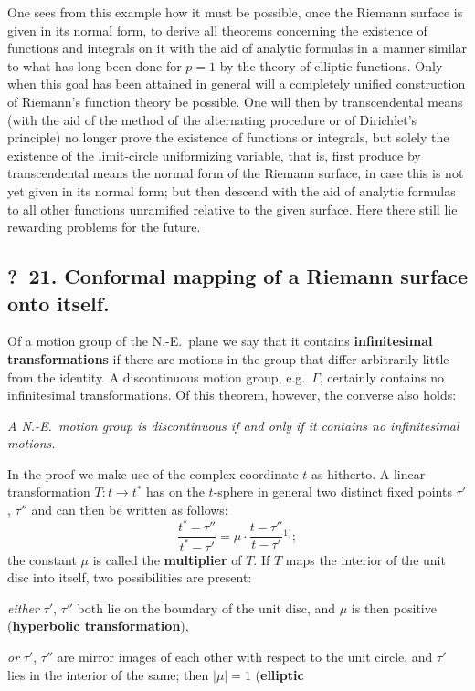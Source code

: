 \documentclass{article}
\begin{document}
One sees from this example how it must be possible, once the Riemann surface is given in its normal form, to derive all theorems concerning the existence of functions and integrals on it with the aid of analytic formulas in a manner similar to what has long been done for $p = 1$ by the theory of elliptic functions. Only when this goal has been attained in general will a completely unified construction of Riemann's function theory be possible. One will then by transcendental means (with the aid of the method of the alternating procedure or of Dirichlet's principle) no longer prove the existence of functions or integrals, but solely the existence of the limit-circle uniformizing variable, that is, first produce by transcendental means the normal form of the Riemann surface, in case this is not yet given in its normal form; but then descend with the aid of analytic formulas to all other functions unramified relative to the given surface. Here there still lie rewarding problems for the future.

\subsection*{?~21. Conformal mapping of a Riemann surface onto itself.}

Of a motion group of the N.-E.\ plane we say that it contains \textbf{infinitesimal transformations} if there are motions in the group that differ arbitrarily little from the identity. A discontinuous motion group, e.g.\ $\varGamma$, certainly contains no infinitesimal transformations. Of this theorem, however, the converse also holds:

\emph{A N.-E.\ motion group is discontinuous if and only if it contains no infinitesimal motions.}

In the proof we make use of the complex coordinate $t$ as hitherto. A linear transformation $T\colon t \to t^*$ has on the $t$-sphere in general two distinct fixed points $\tau'$, $\tau''$ and can then be written as follows:
\[ \frac{t^* - \tau''}{t^* - \tau'} = \mu \cdot \frac{t - \tau''}{t - \tau'}{}^{1)}; \tag{53} \]
the constant $\mu$ is called the \textbf{multiplier} of $T$. If $T$ maps the interior of the unit disc into itself, two possibilities are present:

\emph{either} $\tau'$, $\tau''$ both lie on the boundary of the unit disc, and $\mu$ is then positive (\textbf{hyperbolic transformation}),

\emph{or} $\tau'$, $\tau''$ are mirror images of each other with respect to the unit circle, and $\tau'$ lies in the interior of the same; then $|\mu| = 1$ (\textbf{elliptic}
\end{document}
